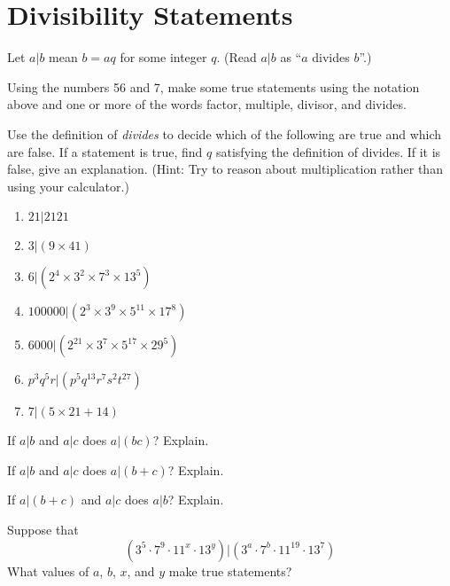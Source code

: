 \newpage
\section{Divisibility Statements}\label{A:divisibilityStatements}

Let $a|b$ mean $b=aq$ for some integer $q$.  (Read $a|b$ as ``$a$ divides $b$''.)  

\begin{prob}
Using the numbers 56 and 7, make some true statements using the notation above and one or more of the words factor, multiple, divisor, and divides.  
\end{prob}

\begin{prob}
Use the definition of \emph{divides} to decide which of the following are true and which are false.  If a statement is true, find $q$ satisfying the definition of divides.  If it is false, give an explanation.  (Hint:  Try to reason about multiplication rather than using your calculator.)
\begin{enumerate}
\item $21|2121$
\item $3|(9\times 41)$
\item $6|(2^4\times 3^2\times 7^3\times 13^5)$
\item $100000|(2^3\times 3^9\times 5^{11}\times 17^8)$
\item $6000|(2^{21}\times 3^7 \times 5^{17}\times 29^5)$
\item $p^3q^5r|(p^5q^{13}r^7s^2t^{27})$
\item $7|(5\times 21 + 14)$
\end{enumerate}
\end{prob}


\begin{prob}
If $a|b$ and $a|c$ does $a|(bc)$?  Explain. 
\end{prob}

\begin{prob}
If $a|b$ and $a|c$ does $a|(b+c)$?  Explain.  
\end{prob}

\begin{prob}
If $a|(b+c)$ and $a|c$ does $a|b$?  Explain.  
\end{prob}

\begin{prob}
Suppose that $$(3^5\cdot 7^9\cdot 11^x\cdot 13^y)|(3^a\cdot 7^b\cdot 11^{19}\cdot 13^7)$$
What values of $a$, $b$, $x$, and $y$ make true statements? 
\end{prob}
